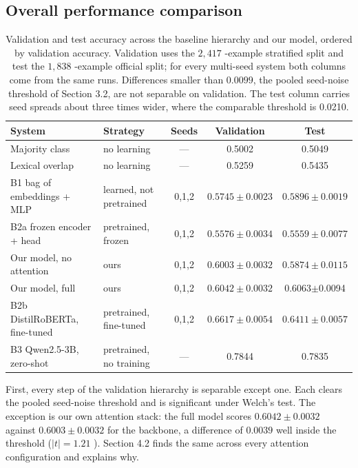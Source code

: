 \documentclass[11pt]{article}
\begin{document}
\subsection{Overall performance comparison}

\begin{table}[t]
  \centering
  \scriptsize
  \caption{Validation and test accuracy across the baseline hierarchy and our model, ordered by validation accuracy. Validation uses the $2,417$ -example stratified split and test the $1,838$ -example official split; for every multi-seed system both columns come from the same runs. Differences smaller than $0.0099$, the pooled seed-noise threshold of Section 3.2, are not separable on validation. The test column carries seed spreads about three times wider, where the comparable threshold is 0.0210.}
  \label{tab:3}
  \begin{tabular}{@{}p{}p{}ccc@{}}
    \toprule
    \textbf{System} & \textbf{Strategy} & \textbf{Seeds} & \textbf{Validation} & \textbf{Test} \\
    \midrule
    Majority class & no learning & --- & 0.5002 & 0.5049 \\
    Lexical overlap & no learning & --- & 0.5259 & 0.5435 \\
    B1 bag of embeddings + MLP & learned, not pretrained & 0,1,2 & $0.5745\pm 0.0023$ & $0.5896\pm 0.0019$ \\
    B2a frozen encoder + head & pretrained, frozen & 0,1,2 & $0.5576\pm 0.0034$ & $0.5559\pm 0.0077$ \\
    Our model, no attention & ours & 0,1,2 & $0.6003\pm 0.0032$ & $0.5874\pm 0.0115$ \\
    Our model, full & ours & 0,1,2 & $0.6042\pm 0.0032$ & 0.6063$\pm$0.0094 \\
    B2b DistilRoBERTa, fine-tuned & pretrained, fine-tuned & 0,1,2 & $0.6617\pm 0.0054$ & $0.6411\pm 0.0057$ \\
    B3 Qwen2.5-3B, zero-shot & pretrained, no training & --- & 0.7844 & 0.7835 \\
    \bottomrule
  \end{tabular}
\end{table}

First, every step of the validation hierarchy is separable except one. Each clears the pooled seed-noise threshold and is significant under Welch's test. The exception is our own attention stack: the full model scores $0.6042\pm 0.0032$ against $0.6003\pm 0.0032$ for the backbone, a difference of $0.0039$ well inside the threshold ($|t|=1.21$ ). Section 4.2 finds the same across every attention configuration and explains why.
\end{document}
